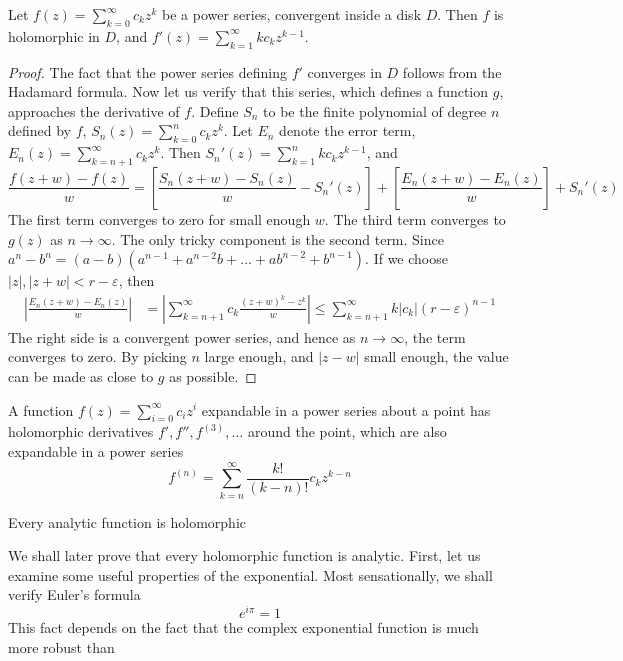 \begin{theorem}
    Let $f(z) = \sum_{k = 0}^\infty c_k z^k$ be a power series, convergent inside a disk $D$. Then $f$ is holomorphic in $D$, and $f'(z) = \sum_{k = 1}^\infty k c_k z^{k-1}$.
\end{theorem}
\begin{proof}
    The fact that the power series defining $f'$ converges in $D$ follows from the Hadamard formula. Now let us verify that this series, which defines a function $g$, approaches the derivative of $f$. Define $S_n$ to be the finite polynomial of degree $n$ defined by $f$, $S_n(z) = \sum_{k = 0}^n c_k z^k$. Let $E_n$ denote the error term, $E_n(z) = \sum_{k = n+1}^\infty c_k z^k$. Then $S_n'(z) = \sum_{k = 1}^n k c_k z^{k-1}$, and
    \[ \frac{f(z + w) - f(z)}{w} = \left[ \frac{S_n(z + w) - S_n(z)}{w} - S_n'(z) \right] + \left[ \frac{E_n(z + w) - E_n(z)}{w} \right] + S_n'(z) \]
    The first term converges to zero for small enough $w$. The third term converges to $g(z)$ as $n \to \infty$. The only tricky component is the second term. Since $a^n - b^n = (a - b)(a^{n-1} + a^{n-2}b + \dots + ab^{n-2} + b^{n-1})$. If we choose $|z|, |z + w| < r - \varepsilon$, then
    \begin{align*}
        \left| \frac{E_n(z + w) - E_n(z)}{w} \right| &= \left| \sum_{k = n + 1}^\infty c_k \frac{(z + w)^k - z^k}{w} \right| \leq \sum_{k = n + 1}^\infty k |c_k| (r - \varepsilon)^{n-1}
    \end{align*}
    The right side is a convergent power series, and hence as $n \to \infty$, the term converges to zero. By picking $n$ large enough, and $|z - w|$ small enough, the value can be made as close to $g$ as possible.
\end{proof}

\begin{corollary}
    A function $f(z) = \sum_{i = 0}^\infty c_i z^i$ expandable in a power series about a point has holomorphic derivatives $f', f'', f^{(3)}, \dots$ around the point, which are also expandable in a power series
    \[ f^{(n)} = \sum_{k = n}^\infty \frac{k!}{(k - n)!} c_k z^{k-n} \]
\end{corollary}

\begin{corollary}
    Every analytic function is holomorphic
\end{corollary}

We shall later prove that every holomorphic function is analytic. First, let us examine some useful properties of the exponential. Most sensationally, we shall verify Euler's formula
%
\[ e^{i \pi} = 1 \]
%
This fact depends on the fact that the complex exponential function is much more robust than 



